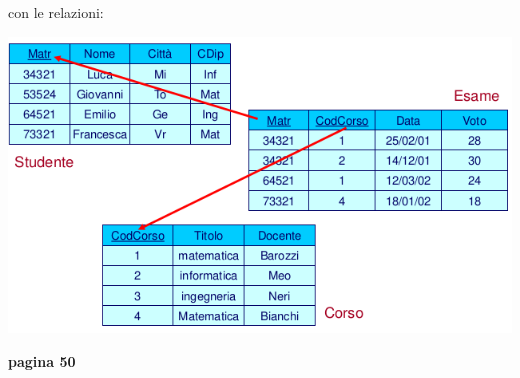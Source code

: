 \documentclass[a4paper,12pt, oneside]{book}
\begin{document}
\begin{esempio}
\begin{center}
\end{center}
con le relazioni:
\begin{center}
\includegraphics[scale=0.7]{img/re.png}
\end{center}
\textbf{pagina 50}
\end{esempio}
\end{document}
